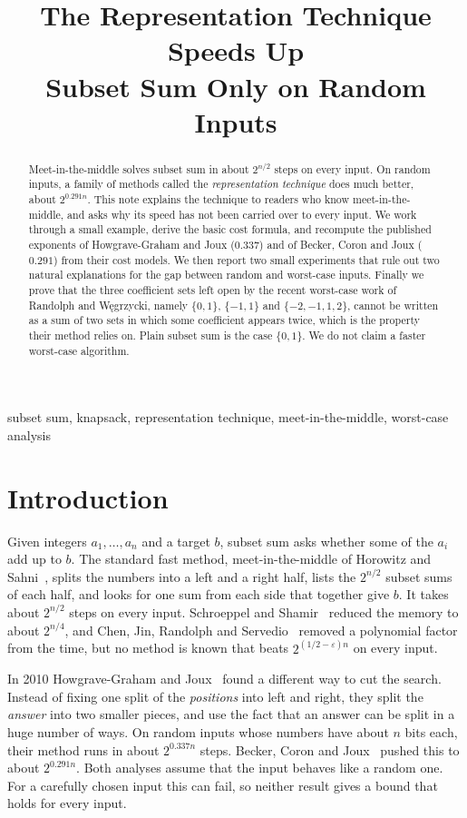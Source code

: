 \documentclass[conference]{IEEEtran}
\title{The Representation Technique Speeds Up\\
Subset Sum Only on Random Inputs}
\author{\IEEEauthorblockN{Le Duc Minh}
\IEEEauthorblockA{\href{mailto:minh.leduc.0210@gmail.com}{minh.leduc.0210@gmail.com}}}
\begin{document}
\maketitle
\begin{abstract}
Meet-in-the-middle solves subset sum in about $2^{n/2}$ steps on every input.
On random inputs, a family of methods called the \emph{representation
technique} does much better, about $2^{0.291n}$. This note explains the
technique to readers who know meet-in-the-middle, and asks why its speed has
not been carried over to every input. We work through a small example, derive
the basic cost formula, and recompute the published exponents of
Howgrave-Graham and Joux ($0.337$) and of Becker, Coron and Joux ($0.291$) from
their cost models. We then report two small experiments that rule out two
natural explanations for the gap between random and worst-case inputs.
Finally we prove that the three coefficient sets left open by the recent
worst-case work of Randolph and W\k{e}grzycki, namely $\{0,1\}$, $\{-1,1\}$ and
$\{-2,-1,1,2\}$, cannot be written as a sum of two sets in which some
coefficient appears twice, which is the property their method relies on. Plain
subset sum is the case $\{0,1\}$. We do not claim a faster worst-case
algorithm.
\end{abstract}
\begin{IEEEkeywords}
subset sum, knapsack, representation technique, meet-in-the-middle,
worst-case analysis
\end{IEEEkeywords}

\section{Introduction}
Given integers $a_1,\dots,a_n$ and a target $b$, subset sum asks whether some of
the $a_i$ add up to $b$. The standard fast method, meet-in-the-middle of
Horowitz and Sahni~\cite{hs}, splits the numbers into a left and a right half,
lists the $2^{n/2}$ subset sums of each half, and looks for one sum from each
side that together give $b$. It takes about $2^{n/2}$ steps on every input.
Schroeppel and Shamir~\cite{ss} reduced the memory to about $2^{n/4}$, and Chen,
Jin, Randolph and Servedio~\cite{chen} removed a polynomial factor from the
time, but no method is known that beats $2^{(1/2-\varepsilon)n}$ on every input.

In 2010 Howgrave-Graham and Joux~\cite{hgj} found a different way to cut the
search. Instead of fixing one split of the \emph{positions} into left and right,
they split the \emph{answer} into two smaller pieces, and use the fact that an
answer can be split in a huge number of ways. On random inputs whose numbers
have about $n$ bits each, their method runs in about $2^{0.337n}$ steps. Becker,
Coron and Joux~\cite{bcj} pushed this to about $2^{0.291n}$. Both analyses assume
that the input behaves like a random one. For a carefully chosen input this can
fail, so neither result gives a bound that holds for every input.
\end{document}
